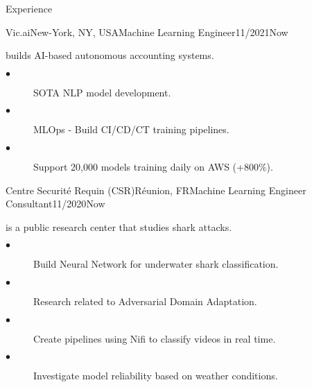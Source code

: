 \documentclass{resume}
\begin{document}
\begin{multicols}{2}
	\begin{rSection}{\Large Experience}
	
		\begin{job}{Vic.ai}{New-York, NY, USA}{Machine Learning Engineer}{11/2021}{Now}{
			builds AI-based autonomous accounting systems.
			\begin{description}
				\item[$\bullet$] SOTA NLP model development.
				\item[$\bullet$] MLOps - Build CI/CD/CT training pipelines.
				\item[$\bullet$] Support 20,000 models training daily on AWS (+800\%).
			\end{description}
		}
		\end{job}

		\begin{job}{Centre Securité Requin (CSR)}{Réunion, FR}{Machine Learning Engineer Consultant}{11/2020}{Now}{
			is a public research center that studies shark attacks.
			\begin{description}
				\item[$\bullet$] Build Neural Network for underwater shark classification.
				\item[$\bullet$] Research related to Adversarial Domain Adaptation.
				\item[$\bullet$] Create pipelines using Nifi to classify videos in real time.
				\item[$\bullet$] Investigate model reliability based on weather conditions.
			\end{description}
		}
		\end{job}


\end{rSection}
\end{multicols}
\end{document}
